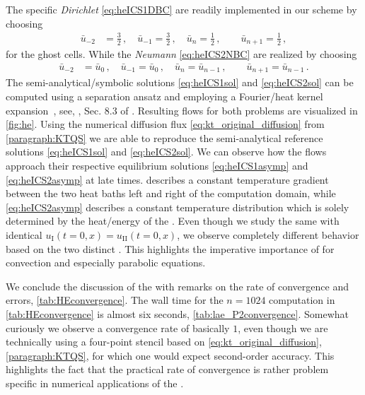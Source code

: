 The specific \textit{Dirichlet} \bcs{} \eqref{eq:heICS1DBC} are readily implemented in our \fv{} scheme by choosing
\begin{align}
	\bar{u}_{-2}&=\tfrac{3}{2}\,,\quad \bar{u}_{-1}=\tfrac{3}{2}\,,\quad
	\bar{u}_{n}=\tfrac{1}{2}\,,\quad\quad \bar{u}_{n+1}=\tfrac{1}{2}\,,
	\label{eq:heICS1DBCFV}
\end{align}
for the ghost cells.
While the \textit{Neumann} \bcs{} \eqref{eq:heICS2NBC} are realized by choosing
\begin{align}
	\bar{u}_{-2}&=\bar{u}_{0}\,,\quad \bar{u}_{-1}=\bar{u}_{0}\,,\quad
	\bar{u}_{n}=\bar{u}_{n-1}\,,\quad\quad \bar{u}_{n+1}=\bar{u}_{n-1}\,.
	\label{eq:heICS2NBCFV}
\end{align}
The semi-analytical/symbolic solutions \eqref{eq:heICS1sol} and \eqref{eq:heICS2sol} can be computed using a separation ansatz and employing a Fourier/heat kernel expansion~\cite{Fourier2009Jul,Koenigstein:2021numericalSchemes}, see, \eg{}, Sec. 8.3 of .
Resulting flows for both problems are visualized in \cref{fig:he}.
Using the numerical diffusion flux \eqref{eq:kt_original_diffusion} from \cref{paragraph:KTQS} we are able to reproduce the semi-analytical reference solutions \eqref{eq:heICS1sol} and \eqref{eq:heICS2sol}.
We can observe how the flows approach their respective equilibrium solutions \eqref{eq:heICS1asymp} and \eqref{eq:heICS2asymp} at late times.
 describes a constant temperature gradient between the two heat baths left and right of the computation domain, while \cref{eq:heICS2asymp} describes a constant temperature distribution which is solely determined by the heat/energy of the \ic{}.
Even though we study the same \pde{} with identical \ics{} $u_\mathrm{I}(t=0,x)=u_\mathrm{II}(t=0,x)$, we observe completely different behavior based on the two distinct \bcs{}.
This highlights the imperative importance of \bc{} for convection and especially parabolic equations.

We conclude the discussion of the \he{} with remarks on the rate of convergence and errors, \cf{} \cref{tab:HEconvergence}.
The wall time for the $n=1024$ computation in \cref{tab:HEconvergence} is almost six seconds, \cf{} \cref{tab:lae_P2convergence}.
Somewhat curiously we observe a convergence rate of basically $1$, even though we are technically using a four-point stencil based on \cref{eq:kt_original_diffusion}, \cf{} \cref{paragraph:KTQS}, for which one would expect second-order accuracy.
This highlights the fact that the practical rate of convergence is rather problem specific in numerical applications of the \ktScheme{}.

